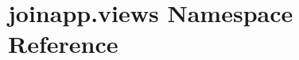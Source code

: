 \hypertarget{namespacejoinapp_1_1views}{}\section{joinapp.\+views Namespace Reference}
\label{namespacejoinapp_1_1views}
